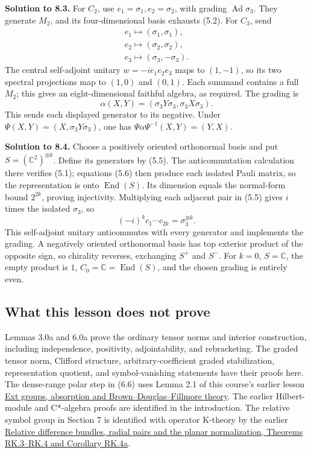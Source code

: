 \documentclass[
  11pt,
]{article}
\begin{document}
\textbf{Solution to 8.3.} For \(C_2\), use
\(e_1=\sigma_1,e_2=\sigma_2\), with grading
\(\operatorname{Ad}\sigma_3\). They generate \(M_2\), and its
four-dimensional basis exhausts (5.2). For \(C_3\), send \[
\begin{gathered}
e_1\mapsto(\sigma_1,\sigma_1),\\
e_2\mapsto(\sigma_2,\sigma_2),\\
e_3\mapsto(\sigma_3,-\sigma_3).
\end{gathered}
\] The central self-adjoint unitary \(w=-ie_1e_2e_3\) maps to
\((1,-1)\), so its two spectral projections map to \((1,0)\) and
\((0,1)\). Each summand contains a full \(M_2\); this gives an
eight-dimensional faithful algebra, as required. The grading is \[
\alpha(X,Y)=(\sigma_3Y\sigma_3,\sigma_3X\sigma_3).
\] This sends each displayed generator to its negative. Under
\(\Psi(X,Y)=(X,\sigma_3Y\sigma_3)\), one has
\(\Psi\alpha\Psi^{-1}(X,Y)=(Y,X)\).

\textbf{Solution to 8.4.} Choose a positively oriented orthonormal basis
and put \(S=(\mathbb C^2)^{\otimes k}\). Define its generators by (5.5).
The anticommutation calculation there verifies (5.1); equations (5.6)
then produce each isolated Pauli matrix, so the representation is onto
\(\operatorname{End}(S)\). Its dimension equals the normal-form bound
\(2^{2k}\), proving injectivity. Multiplying each adjacent pair in (5.5)
gives \(i\) times the isolated \(\sigma_3\), so \[
(-i)^kc_1\cdots c_{2k}=\sigma_3^{\otimes k}.
\] This self-adjoint unitary anticommutes with every generator and
implements the grading. A negatively oriented orthonormal basis has top
exterior product of the opposite sign, so chirality reverses, exchanging
\(S^+\) and \(S^-\). For \(k=0\), \(S=\mathbb C\), the empty product is
\(1\), \(C_0=\mathbb C=\operatorname{End}(S)\), and the chosen grading
is entirely even.

\subsection{What this lesson does not
prove}\label{what-this-lesson-does-not-prove}

Lemmas 3.0a and 6.0a prove the ordinary tensor norms and interior
construction, including independence, positivity, adjointability, and
rebracketing. The graded tensor norm, Clifford structure,
arbitrary-coefficient graded stabilization, representation quotient, and
symbol-vanishing statements have their proofs here. The dense-range
polar step in (6.6) uses Lemma 2.1 of this course's earlier lesson
\href{KT-KK-02.html}{Ext groups, absorption and Brown--Douglas--Fillmore
theory}. The earlier Hilbert-module and C*-algebra proofs are identified
in the introduction. The relative symbol group in Section 7 is
identified with operator K-theory by the earlier
\href{supporting/relative-k-foundations/relative-k-foundations.html\#rk-difference}{Relative
difference bundles, radial pairs and the planar normalization, Theorems
RK.3--RK.4 and Corollary RK.4a}.
\end{document}
